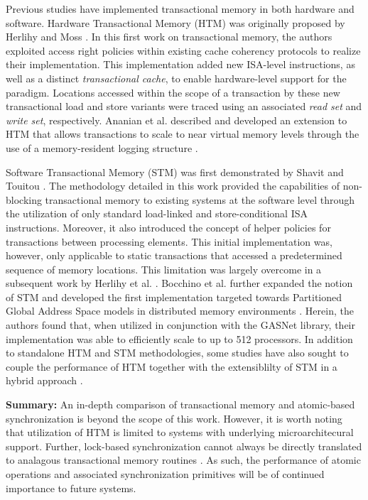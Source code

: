 Previous studies have implemented transactional memory in both hardware and software.
Hardware Transactional Memory (HTM) was originally proposed by Herlihy and Moss \cite{herlihy1993lockfree}.
In this first work on transactional memory, the authors exploited access right policies within existing cache coherency protocols to realize their implementation.
This implementation added new ISA-level instructions, as well as a distinct \textit{transactional cache}, to enable hardware-level support for the paradigm.
Locations accessed within the scope of a transaction by these new transactional load and store variants were traced using an associated \textit{read set} and \textit{write set}, respectively.
Ananian et al. described and developed an extension to HTM that allows transactions to scale to near virtual memory levels through the use of a memory-resident logging structure \cite{ananian2006unbounded}.

Software Transactional Memory (STM) was first demonstrated by Shavit and Touitou \cite{shavit1995softwaretm}.
The methodology detailed in this work provided the capabilities of non-blocking transactional memory to existing systems at the software level through the utilization of only standard load-linked and store-conditional ISA instructions.
Moreover, it also introduced the concept of helper policies for transactions between processing elements.
This initial implementation was, however, only applicable to static transactions that accessed a predetermined sequence of memory locations.
This limitation was largely overcome in a subsequent work by Herlihy et al. \cite{herlihy2003stmdsds}.
Bocchino et al. further expanded the notion of STM and developed the first implementation targeted towards Partitioned Global Address Space models in distributed memory environments \cite{bocchino2008stm}.
Herein, the authors found that, when utilized in conjunction with the GASNet library, their implementation was able to efficiently scale to up to 512 processors.
In addition to standalone HTM and STM methodologies, some studies have also sought to couple the performance of HTM together with the extensiblilty of STM in a hybrid approach \cite{baugh2008using}.

\textbf{Summary:} An in-depth comparison of transactional memory and atomic-based synchronization is beyond the scope of this work.
However, it is worth noting that utilization of HTM is limited to systems with underlying microarchitecural support.
Further, lock-based synchronization cannot always be directly translated to analagous transactional memory routines \cite{blundell2006subtleties}.
As such, the performance of atomic operations and associated synchronization primitives will be of continued importance to future systems.

